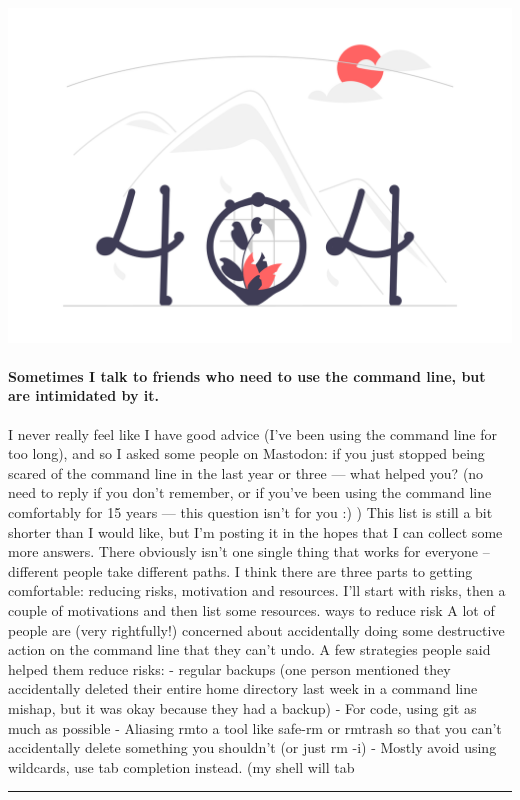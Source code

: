 \documentclass[10pt,a4paper]{article}
\begin{document}
\begin{minipage}[t]{0.80\linewidth}
\vspace{0pt}
\begin{multicols}{2}

    \href{https://jvns.ca/blog/2023/08/08/what-helps-people-get-comfortable-on-the-command-line-/?utm\_source=hackernewsletter\&utm\_medium=email\&utm\_term=fav}{
        \includegraphics[width=0.99\linewidth]{notfound.png}
    }
  
\paragraph{Sometimes I talk to friends who need to use the command line, but are intimidated by it.}
 I never really feel like I have good advice (I’ve been using the command line for too long), and so I asked some people on Mastodon:
if you just stopped being scared of the command line in the last year or three — what helped you?
(no need to reply if you don’t remember, or if you’ve been using the command line comfortably for 15 years — this question isn’t for you :) )
This list is still a bit shorter than I would like, but I’m posting it in the hopes that I can collect some more answers. There obviously isn’t one single thing that works for everyone – different people take different paths.
I think there are three parts to getting comfortable: reducing risks, motivation and resources. I’ll start with risks, then a couple of motivations and then list some resources.
ways to reduce risk
A lot of people are (very rightfully!) concerned about accidentally doing some destructive action on the command line that they can’t undo.
A few strategies people said helped them reduce risks:
- regular backups (one person mentioned they accidentally deleted their entire home directory last week in a command line mishap, but it was okay because they had a backup)
- For code, using git as much as possible
- Aliasing
rmto a tool like safe-rm or rmtrash so that you can’t accidentally delete something you shouldn’t (or just
rm -i)
- Mostly avoid using wildcards, use tab completion instead. (my shell will tab 

\end{multicols}
\end{minipage}
\par\medskip
\noindent\textcolor{red}{\rule{\linewidth}{0.2mm}}
\end{document}
